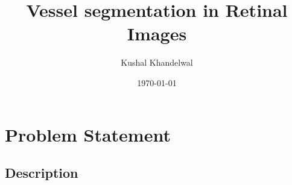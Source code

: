 \documentclass{beamer}
\title[Diabetic Retinopathy]{Vessel segmentation in Retinal Images } %
\author{Kushal Khandelwal} %
\institute[HCI/IWR] %
{
University of Heidelberg \\ %
\medskip
\textit{kushal.khandelwal@iwr.uni-heidelberg.de} %
}
\date{\today} %
\begin{document}
\begin{frame}
\titlepage %
\end{frame}



\section{Problem Statement} %

\subsection{Description} %
\end{document}
